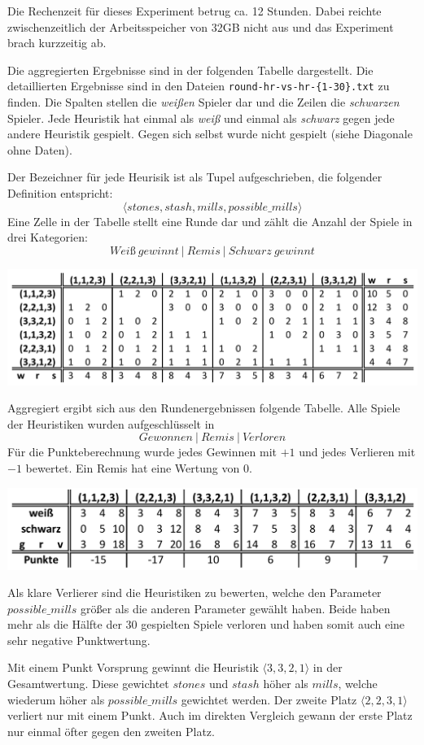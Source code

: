 \documentclass[11pt]{article}
\begin{document}
    Die Rechenzeit für dieses Experiment betrug ca. 12 Stunden. Dabei
reichte zwischenzeitlich der Arbeitsspeicher von 32GB nicht aus und das
Experiment brach kurzzeitig ab.

Die aggregierten Ergebnisse sind in der folgenden Tabelle dargestellt.
Die detaillierten Ergebnisse sind in den Dateien
\texttt{round-hr-vs-hr-\{1-30\}.txt} zu finden. Die Spalten stellen die
\emph{weißen} Spieler dar und die Zeilen die \emph{schwarzen} Spieler.
Jede Heuristik hat einmal als \emph{weiß} und einmal als \emph{schwarz}
gegen jede andere Heuristik gespielt. Gegen sich selbst wurde nicht
gespielt (siehe Diagonale ohne Daten).

Der Bezeichner für jede Heurisik ist als Tupel aufgeschrieben, die
folgender Definition entspricht:
\[\langle stones, stash, mills, possible\_mills \rangle\] Eine Zelle in
der Tabelle stellt eine Runde dar und zählt die Anzahl der Spiele in
drei Kategorien: \[Weiß\ gewinnt\ |\ Remis\ |\ Schwarz\ gewinnt\]

\includegraphics{../images/nmm-hr-vs-hr-rounds.png}

Aggregiert ergibt sich aus den Rundenergebnissen folgende Tabelle. Alle
Spiele der Heuristiken wurden aufgeschlüsselt in
\[Gewonnen\ |\ Remis\ |\ Verloren \] Für die Punkteberechnung wurde
jedes Gewinnen mit \(+1\) und jedes Verlieren mit \(-1\) bewertet. Ein
Remis hat eine Wertung von \(0\).

\includegraphics{../images/nmm-hr-vs-hr-total.png}

Als klare Verlierer sind die Heuristiken zu bewerten, welche den
Parameter \(possible\_mills\) größer als die anderen Parameter gewählt
haben. Beide haben mehr als die Hälfte der 30 gespielten Spiele verloren
und haben somit auch eine sehr negative Punktwertung.

Mit einem Punkt Vorsprung gewinnt die Heuristik
\(\langle 3,3,2,1 \rangle\) in der Gesamtwertung. Diese gewichtet
\(stones\) und \(stash\) höher als \(mills\), welche wiederum höher als
\(possible\_mills\) gewichtet werden. Der zweite Platz
\(\langle 2,2,3,1 \rangle\) verliert nur mit einem Punkt. Auch im
direkten Vergleich gewann der erste Platz nur einmal öfter gegen den
zweiten Platz.
\end{document}
